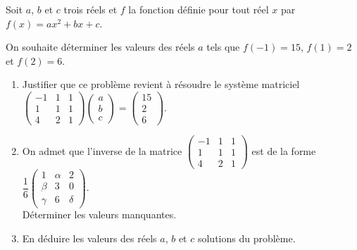 \documentclass[11pt,fleqn]{book} %
\begin{document}
\begin{exercise}[topic=mat03]Soit $a$, $b$ et $c$ trois réels et $f$ la fonction définie pour tout réel $x$ par $f(x)=ax^2+bx+c$. 

On souhaite déterminer les valeurs des réels $a$ tels que $f(-1)=15$, $f(1)=2$ et $f(2)=6$.

\begin{enumerate}
\item Justifier que ce problème revient à résoudre le système matriciel $\begin{pmatrix}-1 & 1 & 1 \\ 1 & 1& 1 \\ 4 & 2 & 1\end{pmatrix}\begin{pmatrix}a \\ b \\c \end{pmatrix} = \begin{pmatrix}15\\2\\6\end{pmatrix}$.
\item On admet que l'inverse de la matrice $\begin{pmatrix}-1 & 1 & 1 \\ 1 & 1& 1 \\ 4 & 2 & 1\end{pmatrix}$ est de la forme $\dfrac{1}{6}\begin{pmatrix}1 & \alpha & 2 \\ \beta & 3 & 0 \\ \gamma & 6 & \delta \end{pmatrix}$. \\Déterminer les valeurs manquantes.
\item En déduire les valeurs des réels $a$, $b$ et $c$ solutions du problème.
\end{enumerate}\end{exercise}
\end{document}
